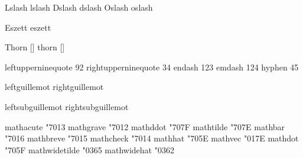 Lslash  {\Lstroke}
 lslash  {\lstroke}
 Dslash  {\Dstroke}
 dslash  {\dstroke}
 Oslash  {\Ostroke}
 oslash  {\ostroke}

 Eszett  {\Ssharp}
 eszett  {\ssharp}

 Thorn {[]}
 thorn {[]}

\stopencoding


\startencoding[default]

 leftupperninequote   92 
 rightupperninequote  34 
 endash              123
 emdash              124
 hyphen               45 

\stopencoding


\startencoding[default]

 leftguillemot     {\leftfakeguillemot }
 rightguillemot    {\rightfakeguillemot}

 leftsubguillemot  {\leftsubfakeguillemot }
 rightsubguillemot {\rightsubfakeguillemot}

\stopencoding


\startencoding[default]

 mathacute      "7013 
 mathgrave      "7012 
 mathddot       "707F 
 mathtilde      "707E 
 mathbar        "7016 
 mathbreve      "7015 
 mathcheck      "7014 
 mathhat        "705E 
 mathvec        "017E 
 mathdot        "705F 
 mathwidetilde  "0365 
 mathwidehat    "0362 

\stopencoding

\endinput
